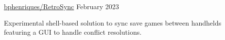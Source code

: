 \begin{cventries}
  \vspace{2mm}

\openSourceEntry
    {\href{https://github.com/bphenriques/knowledge-base}{bphenriques/RetroSync}}
    {February 2023}
    {   
    \begin{openSourceDescription}
    Experimental shell-based solution to sync save games between handhelds featuring a GUI to handle conflict resolutions.
    \end{openSourceDescription}
    \vspace{4mm}
    }
    
\end{cventries}